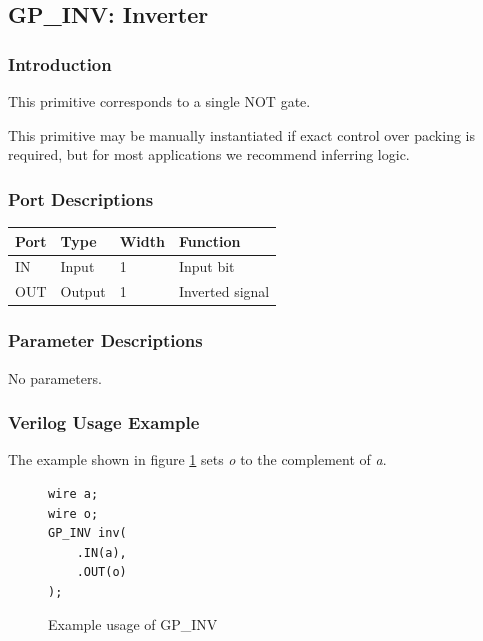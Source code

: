 \documentclass{article}
\begin{document}

\pagebreak
\subsection{GP\_INV: Inverter}

\subsubsection{Introduction}
This primitive corresponds to a single NOT gate.

This primitive may be manually instantiated if exact control over packing is required, but for most applications we 
recommend inferring logic.

\subsubsection{Port Descriptions}

\begin{tabularx}{4in}{|l|l|l|X|}
\hline
{\bfseries Port} & {\bfseries Type} & {\bfseries Width} & {\bfseries Function} \\
\hline
IN & Input & 1 & Input bit \\
\hline
OUT & Output & 1 & Inverted signal \\
\hline
\end{tabularx}

\subsubsection{Parameter Descriptions}

No parameters.

\subsubsection{Verilog Usage Example}

The example shown in figure \ref{gp-inv-example} sets \emph{o} to the complement of \emph{a}.

\begin{figure}[h]
\begin{lstlisting}
wire a;
wire o;
GP_INV inv(
	.IN(a),
	.OUT(o)
);
\end{lstlisting}
\caption{Example usage of GP\_INV}
\label{gp-inv-example}
\end{figure}
\end{document}
